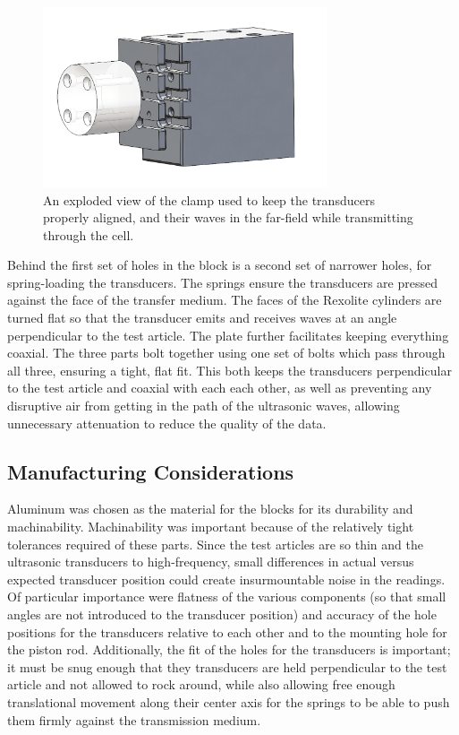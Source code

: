 \begin{figure}[t]\label{fig:clamp}
    \includegraphics[width=0.75\textwidth]{Thesis/clamp.PNG}
    \centering
    \caption{An exploded view of the clamp used to keep the transducers properly aligned, and their waves in the far-field while transmitting through the cell.}
\end{figure}

Behind the first set of holes in the block is a second set of narrower holes, for spring-loading the transducers. The springs ensure the transducers are pressed against the face of the transfer medium. The faces of the Rexolite cylinders are turned flat so that the transducer emits and receives waves at an angle perpendicular to the test article. The plate further facilitates keeping everything coaxial. The three parts bolt together using one set of bolts which pass through all three, ensuring a tight, flat fit. This both keeps the transducers perpendicular to the test article and coaxial with each each other, as well as preventing any disruptive air from getting in the path of the ultrasonic waves, allowing unnecessary attenuation to reduce the quality of the data. 

\subsection{Manufacturing Considerations}
Aluminum was chosen as the material for the blocks for its durability and machinability. Machinability was important because of the relatively tight tolerances required of these parts. Since the test articles are so thin and the ultrasonic transducers to high-frequency, small differences in actual versus expected transducer position could create insurmountable noise in the readings. Of particular importance were flatness of the various components (so that small angles are not introduced to the transducer position) and accuracy of the hole positions for the transducers relative to each other and to the mounting hole for the piston rod. Additionally, the fit of the holes for the transducers is important; it must be snug enough that they transducers are held perpendicular to the test article and not allowed to rock around, while also allowing free enough translational movement along their center axis for the springs to be able to push them firmly against the transmission medium.

